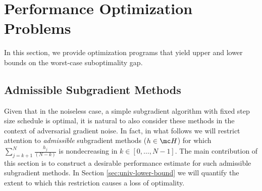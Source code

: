 \documentclass{article}
\begin{document}
\section{Performance Optimization Problems}
In this section, we provide optimization programs that yield upper and lower bounds on the worst-case suboptimality gap.

\subsection{Admissible Subgradient Methods}
Given that in the noiseless case, a simple subgradient algorithm with fixed step size schedule is optimal, it is natural to also consider these methods in the context of adversarial gradient noise. 
In fact, in what follows we will restrict attention to \emph{admissible} subgradient methods ($h\in \mc H$) for which
\(
\sum_{j=k+1}^N \tfrac{h_j}{(N-k)}
\)
is nondecreasing in $k\in [0, \dots, N-1]$. The main contribution of this section is to  construct a desirable performance estimate for such admissible subgradient methods. In Section \ref{sec:univ-lower-bound} we will quantify the extent to which this restriction causes a loss of optimality.
\end{document}
